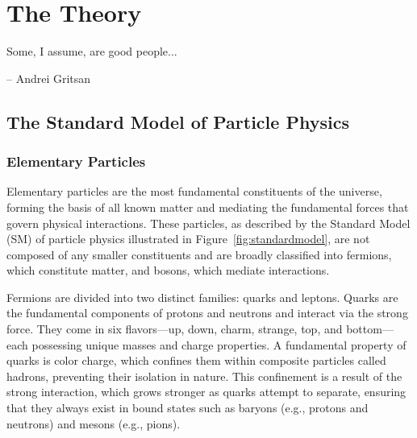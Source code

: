 \chapter{The Theory} \label{chap:chap-2}


\epigraph{Some, I assume, are good people...}{-- Andrei Gritsan}


    



\section{The Standard Model of Particle Physics}


\subsection{Elementary Particles}

Elementary particles are the most fundamental constituents of the universe, forming the basis of all known matter and mediating the fundamental forces that govern physical interactions. These particles, as described by the Standard Model (SM) of particle physics illustrated in Figure~\ref{fig:standardmodel}, are not composed of any smaller constituents and are broadly classified into fermions, which constitute matter, and bosons, which mediate interactions. 

Fermions are divided into two distinct families: quarks and leptons. Quarks are the fundamental components of protons and neutrons and interact via the strong force. They come in six flavors—up, down, charm, strange, top, and bottom—each possessing unique masses and charge properties. A fundamental property of quarks is color charge, which confines them within composite particles called hadrons, preventing their isolation in nature. This confinement is a result of the strong interaction, which grows stronger as quarks attempt to separate, ensuring that they always exist in bound states such as baryons (e.g., protons and neutrons) and mesons (e.g., pions).  

